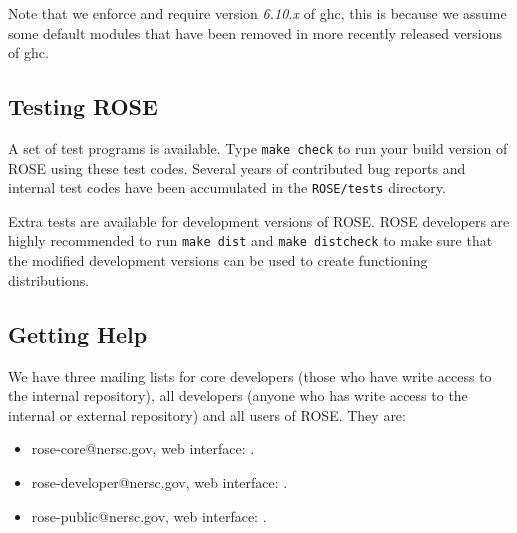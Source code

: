 Note that we enforce and require version {\em 6.10.x} of ghc, this is
because we assume some default modules that have been removed in more 
recently released versions of ghc.

\subsection{Testing ROSE}
     A set of test programs is available.  %
Type {\tt make check} to run your build version of ROSE using these test codes.  
Several years of contributed bug reports and internal test codes have been accumulated 
in the {\tt ROSE/tests} directory.

Extra tests are available for development versions of ROSE. ROSE developers
are highly recommended to run {\tt make dist} and {\tt make distcheck} to make
sure that the modified development versions can be used to create functioning
distributions.

\subsection{Getting Help}

%

We have three mailing lists for core developers (those who have write access to
the internal repository), all developers (anyone who has write access to the
internal or external repository) and all
users of ROSE. They are:
\begin{itemize}
\item rose-core@nersc.gov, web interface: 
.
\item rose-developer@nersc.gov, web interface: 
.
\item rose-public@nersc.gov, web interface:
.
\end{itemize}



